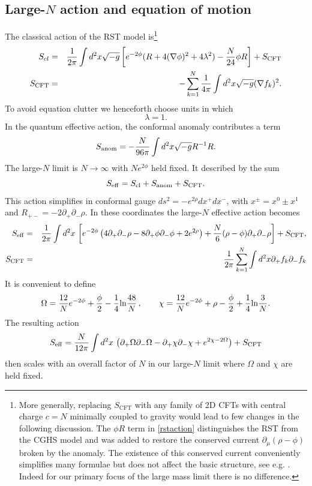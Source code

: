 \documentclass[11pt,oneside,letterpaper]{article}
\newcommand{\p}{\partial}
\newcommand{\f}{\frac}
\newcommand{\be}{\begin{equation}}
\newcommand{\ee}{\end{equation}}
\def\be{\begin{eqnarray}}
\def\ee{\end{eqnarray}}
\newcommand{\bea}{\begin{eqnarray}}
\newcommand{\eea}{\end{eqnarray}}
\let\l=\lambda \let\m=\mu \let\n=\nu \let\x=\xi \let\p=\phi \let\r=v
\let\f=\frac
\def\be{\begin{equation}}
\def\ee{\end{equation}}
\def\del{\partial}
\def\m{{M}}
\def\log{{\rm ln}}
\renewcommand{\p}{\partial}
\numberwithin{equation}{section}
\def \be {\begin{equation}}
\def \ee {\end{equation}}
\begin{document}
\subsection{Large-$N$ action and equation of motion}
The classical action of the RST model  is\footnote{More generally, replacing $S_{\text{CFT}}$ with any family of 2D CFTs with central charge $c=N$ minimally coupled to gravity would lead to few changes in the following discussion. The $\phi R$ term in \eqref{rstaction} distinguishes the RST from the CGHS model \cite{Callan:1992rs} and was added to restore the conserved current $\partial_\mu (\rho-\phi)$ broken by the anomaly. The existence of this conserved current conveniently simplifies many formulae but does not affect the basic structure, see e.g. \cite{Piran:1993tq}. Indeed for our primary focus of the large mass limit there is no difference. }
\bea\label{rstaction}
S_{cl} &=& \f{1}{2\pi}\int d^2 x \sqrt{-g} \left[e^{-2\phi}(R+4(\nabla \phi)^2+4\l^2) 
-\f{N}{24}  \phi R\right]+S_{\text{CFT}}\cr S_{\text{CFT}}&=& -\sum_{k=1}^N\f{1}{4\pi}\int d^2 x \sqrt{-g}(\nabla f_k)^2   .
\eea
To avoid equation clutter we henceforth choose units  in which 
\be \l=1.\ee
In the quantum effective action, the conformal anomaly contributes a term  \be S_{\rm anom} = -\frac{N}{96\pi} \int d^2 x \sqrt{-g}R \Box^{-1}R.\ee   The large-$N$ limit is  $N\to \infty$ with $Ne^{2\phi}$ held fixed. It described  by the sum \be S_{\rm eff}=S_{\rm cl}+S_{\rm anom}+S_{\text{CFT}}.\ee
This action simplifies in conformal gauge $ds^2 = -e^{2\rho}dx^+ dx^-$, with $x^{\pm} = x^0\pm x^1$ and $R_{+-}=-2\del_+\del_-\rho$. In these coordinates the large-$N$ effective action  becomes
\bea\label{rsteff}
S_{\rm eff}&=&\f{1}{2\pi}\int d^2 x\, \left[e^{-2\phi}\left(4\p_+\p_- \rho-8 \p_+\phi \p_-\phi+2e^{2\rho}\right) +\f{N}{6}(\rho-\phi) \partial_+\partial_-\rho \right] +S_{\text{CFT}}, \cr
S_{\text{CFT}}&=& \f{1}{2\pi}\sum_{k=1}^N\int d^2 x \del_+ f_k\del_- f_k  
\eea
It is convenient to define 
\be\label{omegachi}
\Omega = {12 \over N}e^{-2\phi}+\f{\phi}{2}-\f 1 4 \log {48 \over N}\,,\qquad \chi = {12 \over N}e^{-2\phi}+\rho-\f{\phi}{2}+\f 1 4 \log {3 \over N}.
\ee
The resulting action 
\be\label{bilca}
S_{\rm eff}=\f{N}{12\pi}\int d^2 x \,\left(\partial_+ \Omega\partial_- \Omega -\partial_+\chi \partial_-\chi + e^{2\chi-2\Omega}\right)+S_{\text{CFT}}
\ee
then scales with an overall factor of $N$ in our large-$N$ limit where $\Omega$ and $\chi$ are held fixed. 
\end{document}
